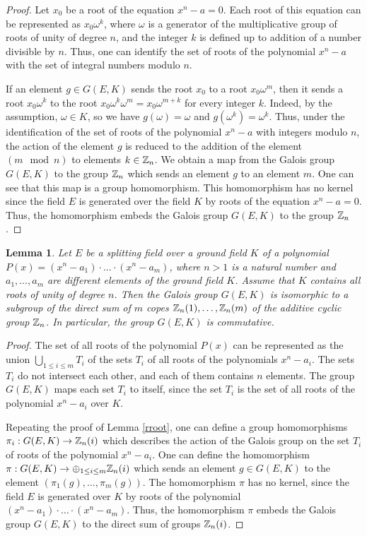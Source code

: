 \documentclass[11pt]{article}
\theoremstyle{plain}
\newtheorem{lemma}[theorem]{Lemma}
\theoremstyle{definition}
\begin{document}
\begin{proof} Let $x_0$ be a root of the equation $x^n-a=0$. Each  root of this equation can be represented as $x_0 \omega^k$, where $\omega$ is a generator of the multiplicative group of  roots of unity of degree $n$, and the integer $k$ is defined up to addition of a number divisible by $n$.
Thus, one can identify the set of roots of the polynomial $x^n-a$ with the set of integral numbers modulo $n$.

If an element $g\in G(E,K)$ sends
the root $x_0$ to a root $x_0\omega^m$, then it sends a root $x_0 \omega^k$ to the root $x_0\omega^k \omega^m=x_0\omega^{m+k}$ for every integer $k$.  Indeed, by the assumption,    $\omega\in K$, so  we have  $g(\omega)=\omega$ and $g(\omega^k)=\omega^k$.   Thus, under the identification of the set of roots of the polynomial $x^n-a$ with integers modulo $n$, the  action of the element $g$ is  reduced to the addition of the element  $(m\mod n)$ to elements  $k\in \Bbb Z_n$. We obtain a map from the Galois group $G(E,K)$ to the group $\Bbb Z_n$ which sends an element $g$ to an element $m$. One can see that this map is a group homomorphism. This homomorphism has no kernel since the field $E$ is generated over the field $K$ by roots of the equation $x^n-a=0$.
Thus, the homomorphism embeds the Galois group $G(E,K)$ to the group $\Bbb Z_n$.

\end{proof}

\begin{lemma}\label{rroots} Let $E$ be a splitting field over a ground field $K$ of a polynomial $P(x)=(x^n-a_1)\cdot \ldots \cdot (x^n-a_m)$, where $n>1$  is a natural number and $a_1,\dots,a_m$ are different elements of the ground field $K$. Assume that $K$ contains all roots of unity of degree $n$.  Then the Galois group $G(E,K)$ is isomorphic to a subgroup of  the direct sum of $m$ copes $\Bbb Z_n(1),\dots, \Bbb Z_n(m)$ of the additive cyclic  group $\Bbb Z_n$. In particular, the group $G(E,K)$ is commutative.
\end{lemma}

\begin{proof} The set of all roots of the polynomial $P(x)$ can be represented as the union $\bigcup_{1\leq i\leq m}T_i$ of the sets $T_i$ of all roots of the polynomials $x^n-a_i$. The sets $T_i$  do not intersect each other, and each of them  contains $n$ elements. The group $G(E,K)$ maps each set $T_i$ to itself, since the set $T_i$ is the set of all roots of the polynomial $x^n-a_i$ over $K$.

Repeating the proof of Lemma \ref{rroot}, one can define a group homomorphisms $\pi_i:G(E,K)\to \Bbb Z_n(i)$ which describes the action of the Galois group on the set $T_i$ of  roots of the polynomial $x^n-a_i$. One can define the homomorphism  $\pi:G(E,K)\to \oplus _{1\leq i\leq m}\Bbb Z_n(i)$ which sends an element $g\in G(E,K)$ to the element $(\pi_1(g),\dots,\pi_m(g))$. The homomorphism $\pi$  has no kernel, since the field $E$ is generated over $K$ by roots of the polynomial $(x^n-a_1)\cdot \ldots \cdot(x^n-a_m)$.
Thus, the homomorphism $\pi$ embeds the Galois group $G(E,K)$ to the direct sum of groups $\Bbb Z_n(i)$.
\end{proof}
\end{document}
